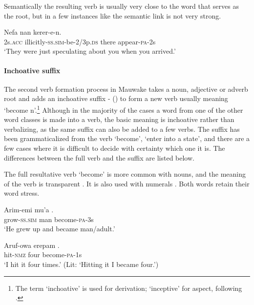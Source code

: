 Semantically the resulting verb is usually very close to the word that serves as the root, but in a few instances like  the semantic link is not very strong.

\ea%
\label{ex:3:x190}
\gll Nefa  nan kerer-e-n. \\
2s.\textsc{acc} illicitly-\textsc{ss}.\textsc{sim}-be-2/3p.\textsc{ds} there appear-\textsc{pa}-2s \\
\glt`They were just speculating about you when you arrived.' 
\z

\paragraph{Inchoative suffix} \label{sec:3.8.2.2.2}
{}
The second verb formation process in Mauwake takes a noun, adjective or adverb root and adds an inchoative suffix - () to form a new verb usually meaning `become n'.\footnote{The term `inchoative' is used for derivation; `inceptive' for aspect, following \citet[95]{Payne1997}.} Although in the majority of the cases a word from one of the other word classes is made into a verb, the basic meaning is inchoative rather than verbalizing, as the same suffix can also be added to a few verbs. The suffix has been grammaticalized from the verb \textstyleEmphasizedVernacularWords{-} `become', `enter into a state', and there are a few cases where it is difficult to decide with certainty which one it is. The differences between the full verb and the suffix are listed below. 

The full resultative verb \textstyleEmphasizedVernacularWords{-} `become' is more common with nouns, and the meaning of the verb is transparent . It is also used with numerals . Both words retain their word stress.

\ea%
\label{ex:3:x191}
\gll Arim-emi mu'a . \\
grow-\textsc{ss}.\textsc{sim} man become-\textsc{pa}-3s \\
\glt`He grew up and became man/adult.'
\z

\ea%
\label{ex:3:x192}
\gll Aruf-owa erepam . \\
hit-\textsc{nmz} four become-\textsc{pa}-1s \\
\glt`I hit it four times.' (Lit: `Hitting it I became four.')
\z

